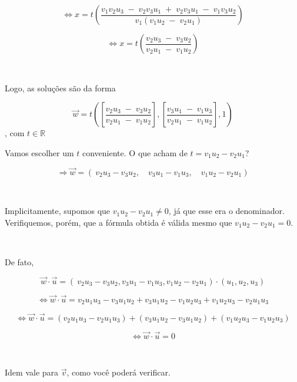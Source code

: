 \[
\Longleftrightarrow x = t \left( \frac{v_1v_2u_3 \; - \; v_2v_3u_1 \; + \; v_2v_3u_1 \; - \; v_1v_3u_2}{v_1(v_1u_2 \; - \; v_2u_1)} \right)
\]

\[
\Longleftrightarrow x = t \left( \frac{v_2u_3 \; - \; v_3u_2}{v_2u_1 \; - \; v_1u_2} \right)
\]

 

Logo, as soluções são da forma

\[
\vec{w} = t \left( \left[ \frac{v_2u_3 \; - \; v_3u_2}{v_2u_1 \; - \; v_1u_2} \right], \left[ \frac{v_3u_1 \; - \; v_1u_3}{v_2u_1 \; - \; v_1u_2} \right], 1 \right) 
\], com \(t \in \mathbb{R}\)




Vamos escolher um \(t\) conveniente. O que acham de \(t = v_1u_2 - v_2u_1\)?

\[
\Longrightarrow \vec{w} = \left(\ v_2u_3 - v_3u_2,\quad v_3u_1 - v_1u_3,\quad v_1u_2 - v_2u_1 \right)
\]

 

Implicitamente, supomos que \(v_1u_2 - v_2u_1 \neq 0\), já que esse era o denominador. Verifiquemos, porém, que a fórmula obtida é válida mesmo que \(v_1u_2 - v_2u_1 = 0\).

 

De fato,

\[
\vec{w} \cdot \vec{u} = (\ v_2u_3 - v_3u_2, v_3u_1 - v_1u_3, v_1u_2 - v_2u_1) \cdot (u_1, u_2, u_3)
\]

\[
\Longleftrightarrow \vec{w} \cdot \vec{u} = v_2u_1u_3 - v_3u_1u_2 + v_3u_1u_2 - v_1u_2u_3 + v_1u_2u_3 - v_2u_1u_3 
\]

\[
\Longleftrightarrow \vec{w} \cdot \vec{u} = (v_2u_1u_3 - v_2u_1u_3) + (v_3u_1u_2 - v_3u_1u_2) + (v_1u_2u_3 - v_1u_2u_3) 
\]

\[
\Longleftrightarrow \vec{w} \cdot \vec{u} = 0
\]

 

Idem vale para \(\vec{v}\), como você poderá verificar.